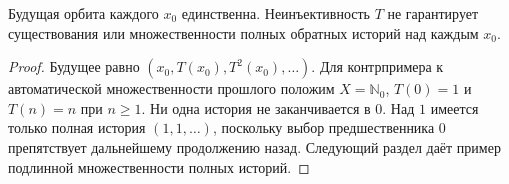 \begin{proposition}
\label{prop:forward-backward}
{Будущая орбита каждого $x_0$ единственна. Неинъективность $T$ не гарантирует существования или множественности полных обратных историй над каждым $x_0$.}
\end{proposition}
\begin{proof}
{Будущее равно $(x_0,T(x_0),T^2(x_0),\ldots)$. Для контрпримера к автоматической множественности прошлого положим $X=\mathbb N_0$, $T(0)=1$ и $T(n)=n$ при $n\ge1$. Ни одна история не заканчивается в $0$. Над $1$ имеется только полная история $(1,1,\ldots)$, поскольку выбор предшественника $0$ препятствует дальнейшему продолжению назад. Следующий раздел даёт пример подлинной множественности полных историй.}
\end{proof}

